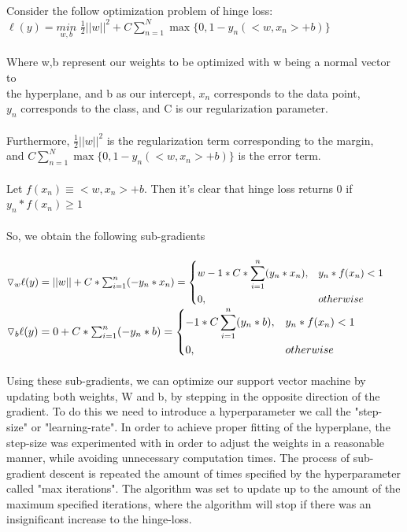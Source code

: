 \documentclass[12pt]{article}%
\begin{document}
	Consider the follow optimization problem of hinge loss:\\
	
	$\ell(y)=\underset{w,b}{min}$ $\frac{1}{2}||w||^2 + C\sum_{n=1}^{N}\max\{0,1-y_n(<w,x_n>+b)\}$\\\\
	\indent Where w,b represent our weights to be optimized with w being a normal vector to\\\indent the hyperplane, and b as our intercept, $x_n$ corresponds to the data point, \\\indent$y_n$ corresponds to the class, and C is our regularization parameter.\\\\\indent
	Furthermore, $\frac{1}{2}||w||^2$ is the regularization term corresponding to the margin,\\\indent and $C\sum_{n=1}^{N}\max\{0,1-y_n(<w,x_n>+b)\}$ is the error term.\\\\\indent
	Let $f(x_n)\equiv<w,x_n>+b$.
	Then it's clear that hinge loss returns 0 if $y_n * f(x_n) \geq 1$\\\\
	\noindent
	So, we obtain the following sub-gradients\\\\\indent
	$\triangledown_w\ell(y)=||w|| + C * \sum_{i=1}^{n}(-y_n * x_n)=
	\begin{dcases}
	w -1 * C*\sum_{i=1}^{n}(y_n*x_n), & y_n * f(x_n) < 1\\
	0, & otherwise \\
	\end{dcases}
	\\\indent$
	$\triangledown_b\ell(y)=0+C*\sum_{i=1}^{n}(-y_n*b)=		\begin{dcases}
	-1 * C\sum_{i=1}^{n}(y_n*b), & y_n * f(x_n) < 1\\
	0, & otherwise \\
	\end{dcases}$
	\\\\\noindent
	Using these sub-gradients, we can optimize our support vector machine by updating both weights, W and b, by stepping in the opposite direction of the gradient.  To do this we need to introduce a hyperparameter we call the "step-size" or "learning-rate".  In order to achieve proper fitting of the hyperplane, the step-size was experimented with in order to adjust the weights in a reasonable manner, while avoiding unnecessary computation times.  The process of sub-gradient descent is repeated the amount of times specified by the hyperparameter called "max iterations".  The algorithm was set to update up to the amount of the maximum specified iterations, where the algorithm will stop if there was an insignificant increase to the hinge-loss. 
	
\end{document}
